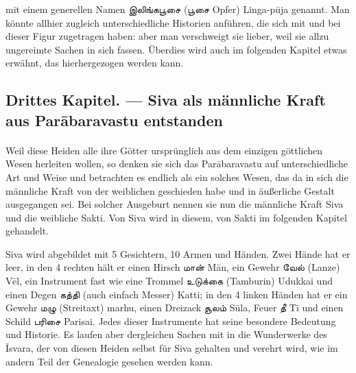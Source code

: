 \documentclass{article}
\newcommand{\TamilText}[1]{\texttamil{#1}}
\newcommand{\tam}[1]{\TamilText{#1}}
\begin{document}
mit einem generellen Namen \tam{இலிங்கபூசை} (\tam{பூசை} Opfer) Linga-p\={u}ja genannt. Man könnte allhier zugleich unterschiedliche Historien anführen, die sich mit und bei dieser Figur zugetragen haben: aber man verschweigt sie lieber, weil sie allzu ungereimte Sachen in sich fassen. Überdies wird auch im folgenden Kapitel etwas erwähnt, das hierhergezogen werden kann.
\clearpage
\subsection{Drittes Kapitel. — Siva als männliche Kraft aus Par\={a}baravastu entstanden}
\paragraph{}
Weil diese Heiden alle ihre Götter ursprünglich aus dem einzigen göttlichen Wesen herleiten wollen, so denken sie sich das Par\={a}baravastu auf unterschiedliche Art und Weise und betrachten es endlich als ein solches Wesen, das da in sich die männliche Kraft von der weiblichen geschieden habe und in äußerliche Gestalt ausgegangen sei. Bei solcher Ausgeburt nennen sie nun die männliche Kraft Siva und die weibliche Sakti. Von Siva wird in diesem, von Sakti im folgenden Kapitel gehandelt.

Siva wird abgebildet mit 5 Gesichtern, 10 Armen und Händen. Zwei Hände hat er leer, in den 4 rechten hält er einen Hirsch \tam{மான்} M\={a}n, ein Gewehr \tam{வேல்} (Lanze) V\={e}l, ein Instrument fast wie eine Trommel \tam{உடுக்கை} (Tamburin) Udukkai und einen Degen \tam{கத்தி} (auch einfach Messer) Katti; in den 4 linken Händen hat er ein Gewehr \tam{மழு} (Streitaxt) marhu, einen Dreizack \tam{சூலம்} S\={u}la, Feuer \tam{தீ} T\={i} und einen Schild \tam{பரிசை} Parisai. Jedes dieser Instrumente hat seine besondere Bedeutung und Historie. Es laufen aber dergleichen Sachen mit in die Wunderwerke des \={I}svara, der von diesen Heiden selbst für Siva gehalten und verehrt wird, wie im andern Teil der Genealogie gesehen werden kann.
\end{document}
